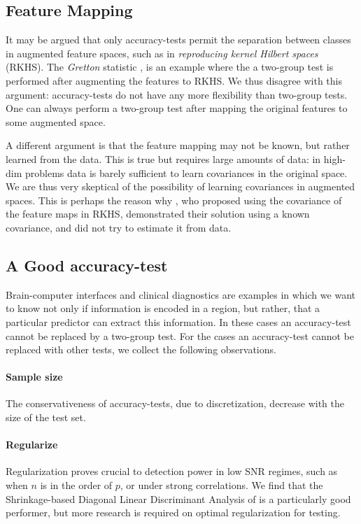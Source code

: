 \documentclass[]{bio}
\begin{document}
\subsection{Feature Mapping}
It may be argued that only accuracy-tests permit the separation between classes in augmented feature spaces, such as in \emph{reproducing kernel Hilbert spaces} (RKHS). 
The \emph{Gretton} statistic \cite{gretton_kernel_2012-1}, is an example where the a two-group test is performed after augmenting the features to RKHS.
We thus disagree with this argument: accuracy-tests do not have any more flexibility than two-group tests. 
One can always perform a two-group test after mapping the original features to some augmented space. 


A different argument is that the feature mapping may not be known, but rather learned from the data. 
This is true but requires large amounts of data: in high-dim problems data is barely sufficient to learn covariances in the original space. 
We are thus very skeptical of the possibility of learning covariances in augmented spaces. 
This is perhaps the reason why \cite{harchaoui2009kernel}, who proposed using the covariance of the feature maps in RKHS, demonstrated their solution using a known covariance, and did not try to estimate it from data. 


\subsection{A Good accuracy-test}
Brain-computer interfaces and clinical diagnostics \cite{olivetti_induction_2012,wager_fmri-based_2013} are examples in which we want to know not only if information is encoded in a region, but rather, that a particular predictor can extract this information. 
In these cases an accuracy-test cannot be replaced by a two-group test. 
For the cases an accuracy-test cannot be replaced with other tests, we collect the following observations.

\paragraph{Sample size} The conservativeness of accuracy-tests, due to discretization, decrease with the size of the test set. 

\paragraph{Regularize}
Regularization proves crucial to detection power in low SNR regimes, such as when $n$ is in the order of $p$, or under strong correlations.
We find that the Shrinkage-based Diagonal Linear Discriminant Analysis of \cite{pang_shrinkage-based_2009} is a particularly good performer, but more research is required on optimal regularization for testing. 
\end{document}
